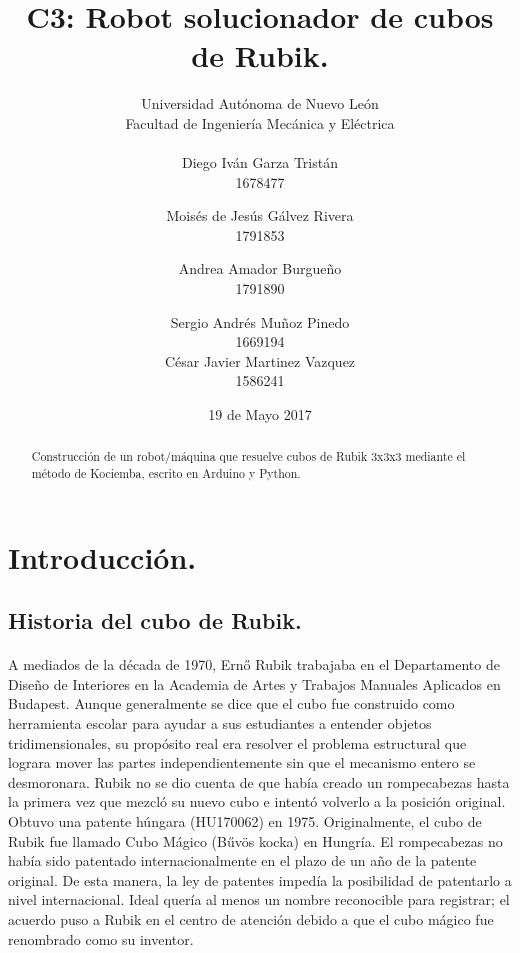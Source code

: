\documentclass[12pt, letterpaper]{article}
\author{
Universidad Autónoma de Nuevo León \\
Facultad de Ingeniería Mecánica y Eléctrica \\
\\
Diego Iván Garza Tristán\\
1678477
\\
\and
Moisés de Jesús Gálvez Rivera\\
1791853
\and
Andrea Amador Burgueño\\
1791890
\and
Sergio Andrés Muñoz Pinedo\\
1669194
\\[3ex]
César Javier Martinez Vazquez\\
1586241
}
\title{C3: Robot solucionador de cubos de Rubik.}
\date{19 de Mayo 2017}
\begin{document}
\maketitle
{}
\newpage
\tableofcontents
\newpage
{}
\begin{abstract}
Construcción de un robot/máquina que resuelve cubos de Rubik 3x3x3 mediante el método de Kociemba, escrito en Arduino y Python.
\end{abstract}

\section{Introducción.}
\subsection{Historia del cubo de Rubik.}
\paragraph{}
A mediados de la década de 1970, Ernő Rubik trabajaba en el Departamento de Diseño de Interiores en la Academia de Artes y Trabajos Manuales Aplicados en Budapest. Aunque generalmente se dice que el cubo fue construido como herramienta escolar para ayudar a sus estudiantes a entender objetos tridimensionales, su propósito real era resolver el problema estructural que lograra mover las partes independientemente sin que el mecanismo entero se desmoronara. Rubik no se dio cuenta de que había creado un rompecabezas hasta la primera vez que mezcló su nuevo cubo e intentó volverlo a la posición original. Obtuvo una patente húngara (HU170062) en 1975. Originalmente, el cubo de Rubik fue llamado Cubo Mágico (Bűvös kocka) en Hungría. El rompecabezas no había sido patentado internacionalmente en el plazo de un año de la patente original. De esta manera, la ley de patentes impedía la posibilidad de patentarlo a nivel internacional. Ideal quería al menos un nombre reconocible para registrar; el acuerdo puso a Rubik en el centro de atención debido a que el cubo mágico fue renombrado como su inventor.
\end{document}
